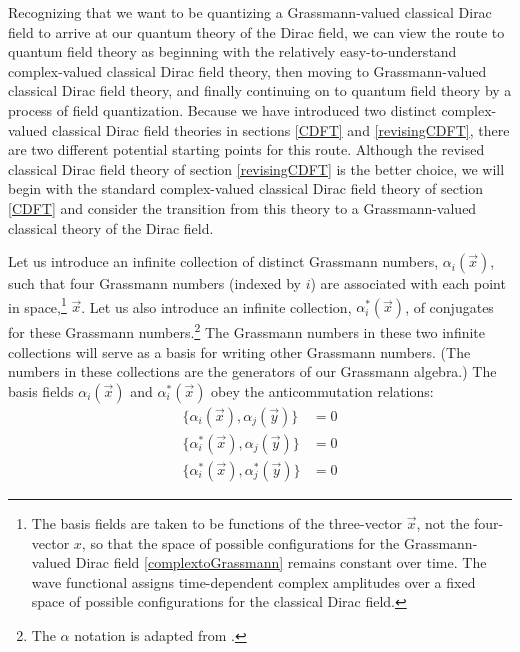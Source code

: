 \documentclass[12pt,secnumarabic,amsmath,amssymb,balancelastpage,nofootinbib]{article}
\begin{document}
Recognizing that we want to be quantizing a Grassmann-valued classical Dirac field to arrive at our quantum theory of the Dirac field, we can view the route to quantum field theory as beginning with the relatively easy-to-understand complex-valued classical Dirac field theory, then moving to Grassmann-valued classical Dirac field theory, and finally continuing on to quantum field theory by a process of field quantization.  Because we have introduced two distinct complex-valued classical Dirac field theories in sections \ref{CDFT} and \ref{revisingCDFT}, there are two different potential starting points for this route.  Although the revised classical Dirac field theory of section \ref{revisingCDFT} is the better choice, we will begin with the standard complex-valued classical Dirac field theory of section \ref{CDFT} and consider the transition from this theory to a Grassmann-valued classical theory of the Dirac field.

Let us introduce an infinite collection of distinct Grassmann numbers, $\alpha_i(\vec{x})$, such that four Grassmann numbers (indexed by $i$) are associated with each point in space,\footnote{The basis fields are taken to be functions of the three-vector $\vec{x}$, not the four-vector $x$, so that the space of possible configurations for the Grassmann-valued Dirac field \eqref{complextoGrassmann} remains constant over time.  The wave functional assigns time-dependent complex amplitudes over a fixed space of possible configurations for the classical Dirac field.} $\vec{x}$.  Let us also introduce an infinite collection, $\alpha^*_i(\vec{x})$, of conjugates for these Grassmann numbers.\footnote{The $\alpha$ notation is adapted from \citet[pg.\ 62--67]{berezin}.}  The Grassmann numbers in these two infinite collections will serve as a basis for writing other Grassmann numbers.  (The numbers in these collections are the generators of our Grassmann algebra.)  The basis fields $\alpha_i(\vec{x})$ and $\alpha^*_i(\vec{x})$ obey the anticommutation relations:
\begin{align}
\{\alpha_i(\vec{x}),\alpha_j(\vec{y})\}&=0
\nonumber
\\
\{\alpha^*_i(\vec{x}),\alpha_j(\vec{y})\}&=0
\nonumber
\\
\{\alpha^*_i(\vec{x}),\alpha^*_j(\vec{y})\}&=0
\label{alphaanticommutation}
\end{align}
\end{document}
